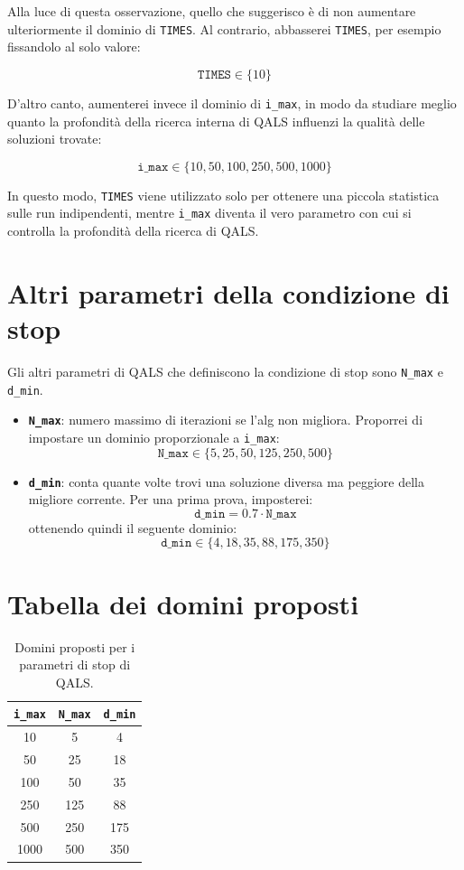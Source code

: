\documentclass[a4paper,12pt]{article}
\begin{document}
Alla luce di questa osservazione, quello che suggerisco è di non aumentare ulteriormente il dominio di \texttt{TIMES}. Al contrario, abbasserei \texttt{TIMES}, per esempio fissandolo al solo valore:

\[
\texttt{TIMES} \in \{10\}
\]

D'altro canto, aumenterei invece il dominio di \texttt{i\_max}, in modo da studiare meglio quanto la profondità della ricerca interna di QALS influenzi la qualità delle soluzioni trovate:

\[
\texttt{i\_max} \in \{10, 50, 100, 250, 500, 1000\}
\]

In questo modo, \texttt{TIMES} viene utilizzato solo per ottenere una piccola statistica sulle run indipendenti, mentre \texttt{i\_max} diventa il vero parametro con cui si controlla la profondità della ricerca di QALS.

\section{Altri parametri della condizione di stop}

Gli altri parametri di QALS che definiscono la condizione di stop sono \texttt{N\_max} e \texttt{d\_min}.

\begin{itemize}[leftmargin=1.5cm]
    \item \textbf{\texttt{N\_max}}: numero massimo di iterazioni se l'alg non migliora.
                                    Proporrei di impostare un dominio proporzionale a \texttt{i\_max}:
    \[
    \texttt{N\_max} \in \{5, 25, 50, 125, 250, 500\}
    \]

    \item \textbf{\texttt{d\_min}}: conta quante volte trovi una soluzione diversa ma peggiore della migliore corrente. 
                                    Per una prima prova, imposterei:
    \[
    \texttt{d\_min} = 0.7 \cdot \texttt{N\_max}
    \]
    ottenendo quindi il seguente dominio:
    \[
    \texttt{d\_min} \in \{4, 18, 35, 88, 175, 350\}
    \]
\end{itemize}

\section{Tabella dei domini proposti}

\begin{table}[h]
\centering
\begin{tabular}{ccc}
\toprule
\texttt{i\_max} & \texttt{N\_max} & \texttt{d\_min} \\
\midrule
10   & 5   & 4   \\
50   & 25  & 18  \\
100  & 50  & 35  \\
250  & 125 & 88  \\
500  & 250 & 175 \\
1000 & 500 & 350 \\
\bottomrule
\end{tabular}
\caption{Domini proposti per i parametri di stop di QALS.}
\end{table}
\end{document}
